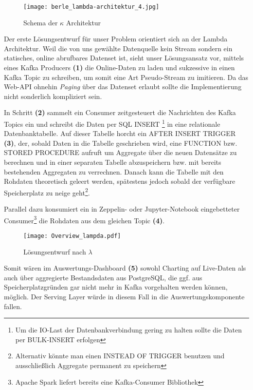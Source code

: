 \begin{description}
\begin{figure}[h]
	\centering
	\texttt{[image: berle\_lambda-architektur\_4.jpg]}
	\caption[Schema der $\kappa$ Architektur]{Schema der $\kappa$ Architektur\autocite{TODO}}
	\label{fig:KappaArchitecture}
\end{figure}

\end{description}

Der erste Lösungsentwurf für unser Problem orientiert sich an der Lambda Architektur. Weil die von uns gewählte Datenquelle kein Stream sondern ein statisches, online abrufbares Datenset ist, sieht unser Lösungsansatz vor, mittels eines Kafka Producers \textbf{(1)} die Online-Daten zu laden und sukzessive in einen Kafka Topic zu schreiben, um somit eine Art Pseudo-Stream zu imitieren. Da das Web-API ohnehin \textit{Paging} über das Datenset erlaubt sollte die Implementierung nicht sonderlich kompliziert sein.

In Schritt \textbf{(2)} sammelt ein Consumer zeitgesteuert die Nachrichten des Kafka Topics ein und schreibt die Daten per SQL INSERT \footnote{Um die IO-Last der Datenbankverbindung gering zu halten sollte die Daten per BULK-INSERT erfolgen} in eine relationale Datenbanktabelle. Auf dieser Tabelle horcht ein AFTER INSERT TRIGGER \textbf{(3)}, der, sobald Daten in die Tabelle geschrieben wird, eine FUNCTION bzw. STORED PROCEDURE aufruft um Aggregate über die neuen Datensätze zu berechnen und in einer separaten Tabelle abzuspeichern bzw. mit bereits bestehenden Aggregaten zu verrechnen. Danach kann die Tabelle mit den Rohdaten theoretisch geleert werden, spätestens jedoch sobald der verfügbare Speicherplatz zu neige geht\footnote{Alternativ könnte man einen INSTEAD OF TRIGGER benutzen und ausschließlich Aggregate permanent zu speichern}.

Parallel dazu konsumiert ein in Zeppelin- oder Jupyter-Notebook eingebetteter Consumer\footnote{Apache Spark liefert bereits eine Kafka-Consumer Bibliothek} die Rohdaten aus dem gleichen Topic \textbf{(4)}. 

\begin{figure}[h] %
	\centering
	\texttt{[image: Overview\_lampda.pdf]}
	\caption[Lösungsentwurf nach $\lambda$]{Lösungsentwurf nach $\lambda$}
	\label{fig:OurLampdaArchitecture}
\end{figure}

Somit wären im Auswertungs-Dashboard \textbf{(5)} sowohl Charting auf Live-Daten als auch über aggregierte Bestandsdaten aus PostgreSQL, die ggf. aus Speicherplatzgründen gar nicht mehr in Kafka vorgehalten werden können, möglich. Der Serving Layer würde in diesem Fall in die Auswertungskomponente fallen.


